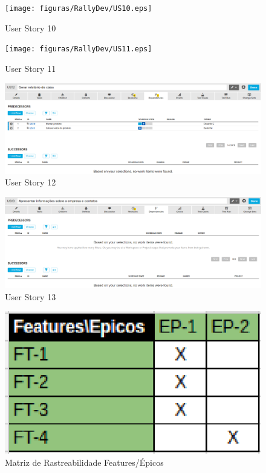 \begin{figure}[h]
    \centering
    \label{fig01}
        \texttt{[image: figuras/RallyDev/US10.eps]}
    \caption{User Story 10}
\end{figure}

\begin{figure}[h]
    \centering
    \label{fig01}
        \texttt{[image: figuras/RallyDev/US11.eps]}
    \caption{User Story 11}
\end{figure}

\begin{figure}[h]
    \centering
    \label{fig01}
        \includegraphics[keepaspectratio=true,scale=0.3]{figuras/RallyDev/US12.eps}
    \caption{User Story 12}
\end{figure}

\begin{figure}[h]
    \centering
    \label{fig01}
        \includegraphics[keepaspectratio=true,scale=0.3]{figuras/RallyDev/US13.eps}
    \caption{User Story 13}
\end{figure}

\begin{figure}[h]
    \centering
    \label{fig01}
        \includegraphics[keepaspectratio=true,scale=1]{figuras/RallyDev/matriz.eps}
    \caption{Matriz de Rastreabilidade Features/Épicos}
\end{figure}

